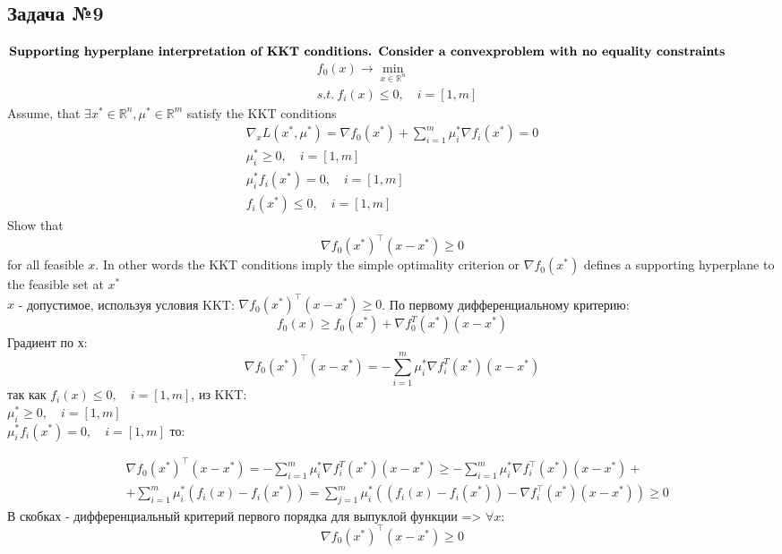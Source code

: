 \documentclass[12pt,letterpaper]{article}
\begin{document}
\subsection*{Задача №9}
$\textbf{Supporting hyperplane interpretation of KKT conditions. Consider a convex}\\ \textbf{problem with no equality constraints}$
$$\begin{aligned}
&f_{0}(x) \rightarrow \min _{x \in \mathbb{R}^{n}} \\
&s.t.\ f_{i}(x) \leq 0, \quad i=[1, m]
\end{aligned} $$
Assume, that \(\exists x^* \in \mathbb{R}^n, \mu^* \in \mathbb{R}^m\) satisfy the KKT conditions
$$
\begin{array}{l}
\nabla_{x} L\left(x^{*}, \mu^{*}\right)=\nabla f_{0}\left(x^{*}\right)+\sum_{i=1}^{m} \mu_{i}^{*} \nabla f_{i}\left(x^{*}\right)=0 \\
\mu_{i}^{*} \geq 0, \quad i=[1, m] \\
\mu_{i}^{*} f_{i}\left(x^{*}\right)=0, \quad i=[1, m] \\
f_{i}\left(x^{*}\right) \leq 0, \quad i=[1, m]
\end{array}
$$
Show that
$$
\nabla f_{0}\left(x^{*}\right)^{\top}\left(x-x^{*}\right) \geq 0
$$
for all feasible $x$. In other words the KKT conditions imply the simple optimality criterion or $\nabla f_{0}\left(x^{*}\right)$ defines a supporting hyperplane to the feasible set at $x^{*}$\\

$ x $ - допустимое, используя условия KKT: $ \nabla f_{0}\left(x^{*}\right)^{\top}\left(x-x^{*}\right) \geq 0 $.
По первому дифференциальному критерию: 
$$ f_0(x) \geq f_0(x^*)+\nabla f_0^{T}(x^*)(x-x^*) $$
Градиент по х:
$$\nabla f_{0}\left(x^{*}\right)^{\top}\left(x-x^{*}\right) = - \sum_{i=1}^{m} \mu_{i}^{*} \nabla f_{i}^{T}\left(x^{*}\right) \left(x-x^{*}\right)$$
так как $ f_{i}(x) \leq 0, \quad i=[1, m] $, из KKT:\\
$ \mu_{i}^{*} \geq 0, \quad i=[1, m] $ \\
$ \mu_{i}^{*} f_{i}\left(x^{*}\right)=0, \quad i=[1, m] $ то: 

$$\begin{aligned}
&\nabla f_{0}\left(x^{*}\right)^{\top}\left(x-x^{*}\right)= - \sum_{i=1}^{m} \mu_{i}^{*} \nabla f_{i}^{T}\left(x^{*}\right) \left(x-x^{*}\right) \geqslant -\sum_{i=1}^{m} \mu_{i}^{*} \nabla f_{i}^{\top}\left(x^{*}\right)\left(x-x^{*}\right)+ \\
&+\sum_{i=1}^{m} \mu_{i}^{*}\left(f_{i}(x)-f_{i}\left(x^{*}\right)\right)=\sum_{j=1}^{m} \mu_{i}^{*}\left(\left(f_{i}(x)-f_{i}\left(x^{*}\right)\right)-\nabla f_{i}^{\top}\left(x^{*}\right)\left(x-x^{*}\right)\right) \geqslant 0
\end{aligned} $$
В скобках - дифференциальный критерий первого порядка для выпуклой функции => $\forall x:$
$$\nabla f_{0}\left(x^{*}\right)^{\top}\left(x-x^{*}\right) \geq 0$$
\end{document}
